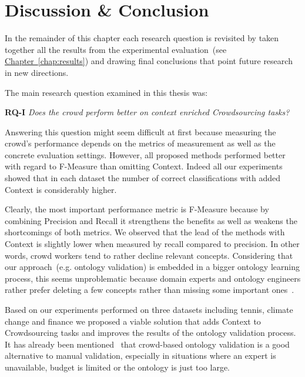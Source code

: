 \chapter{Discussion \& Conclusion}\label{chap:discussion_and_conclusion}

In the remainder of this chapter each research question is revisited by taken together all the results from the experimental evaluation~(see \hyperref[chap:results]{Chapter~\ref*{chap:results}}) and drawing final conclusions that point future research in new directions. 

The main research question examined in this thesis was:
 
\textbf{RQ-I} \emph{Does the crowd perform better on context enriched Crowdsourcing tasks?}

Answering this question might seem difficult at first because measuring the crowd's performance depends on the metrics of measurement as well as the concrete evaluation settings. However, all proposed methods performed better with regard to F-Measure than omitting Context. Indeed all our experiments showed that in each dataset the number of correct classifications with added Context is considerably higher. 

Clearly, the most important performance metric is F-Measure because by combining Precision and Recall it strengthens the benefits as well as weakens the shortcomings of both metrics. We observed that the lead of the methods with Context is slightly lower when measured by recall compared to precision. In other words, crowd workers tend to rather decline relevant concepts. Considering that our approach~(e.g. ontology validation) is embedded in a bigger ontology learning process, this seems unproblematic because domain experts and ontology engineers rather prefer deleting a few concepts rather than missing some important ones~\cite{sabou2006}. 

Based on our experiments performed on three datasets including tennis, climate change and finance we proposed a viable solution that adds Context to Crowdsourcing tasks and improves the results of the ontology validation process. It has already been mentioned~\cite{mortensen2015, mortensen2016, wohlgenannt2016} that crowd-based ontology validation is a good alternative to manual validation, especially in situations where an expert is unavailable, budget is limited or the ontology is just too large. 

